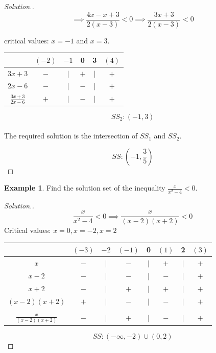 \documentclass[11pt,a4paper]{article}
\theoremstyle{definition}
\newtheorem{example}[thm]{Example}
\newenvironment{solution}
  {\renewcommand{\qedsymbol}{}\begin{proof}[\textit{Solution}.]}
  {\end{proof}}
\begin{document}
\begin{solution}
$$\implies \frac{4x-x+3}{2(x-3)}<0\implies \frac{3x+3}{2(x-3)}<0$$

critical values: $x=-1$ and $x=3$.\\

\begin{table}[H]
\centering
\begin{tabular}{cccccc}
& $(-2)$ & $-1$ & 0 & 3 & $(4)$\\
\hline
\multicolumn{1}{c|}{$3x+3$}  & $-$ & $|$ & $+$ & $|$ & $+$\\
\multicolumn{1}{c|}{$2x-6$}  & $-$ & $|$ & $-$ & $|$ & $+$\\
\multicolumn{1}{c|}{$\frac{3x+3}{2x-6}$} & $+$ & $|$ & $-$ & $|$ & $+$\\
\end{tabular}
\end{table}


$$SS_2:(-1,3)$$\\

The required solution is the intersection of $SS_1$ and $SS_2$.

$$SS:\left(-1,\frac{3}{5}\right)$$
\end{solution}
\begin{example}

Find the solution set of the inequality $\frac{x}{x^2-4}<0$.
\end{example}
\begin{solution}

$$\frac{x}{x^2-4}<0\implies \frac{x}{(x-2)(x+2)}<0$$
Critical values: $x=0, x=-2, x=2$

\begin{table}[H]
\centering
\begin{tabular}{cccccccc}
& $(-3)$ & $-2$ & $(-1)$ & 0 & $(1)$ & 2 & $(3)$\\
\hline
\multicolumn{1}{c|}{$x$} & $-$ & $|$ & $-$ & $|$ & $+$ & $|$ & $+$\\
\multicolumn{1}{c|}{$x-2$} & $-$ & $|$ & $-$ & $|$ & $-$ & $|$ & $+$\\
\multicolumn{1}{c|}{$x+2$} & $-$ & $|$ & $+$ & $|$ & $+$ & $|$ & $+$\\
\multicolumn{1}{c|}{$(x-2)(x+2)$} & $+$& $|$ & $-$ & $|$ & $-$ & $|$ & $+$\\
\multicolumn{1}{c|}{}&&&&&&&\\
\multicolumn{1}{c|}{$\frac{x}{(x-2)(x+2)}$} & $-$ & $|$ & $+$ & $|$ & $-$ & $|$ & $+$\\
\end{tabular}
\end{table}

$$SS:(-\infty,-2)\cup (0,2)$$
\end{solution}
\pagebreak
\end{document}

